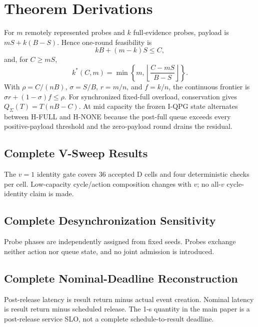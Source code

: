 \documentclass[10pt,onecolumn]{IEEEtran}
\begin{document}
\section{Theorem Derivations}
For $m$ remotely represented probes and $k$ full-evidence probes, payload is $mS+k(B-S)$. Hence one-round feasibility is
\[kB+(m-k)S\le C,\]
and, for $C\ge mS$,
\[k^*(C,m)=\min\left\{m,\left\lfloor\frac{C-mS}{B-S}\right\rfloor\right\}.\]
With $\rho=C/(nB)$, $\sigma=S/B$, $r=m/n$, and $f=k/n$, the continuous frontier is $\sigma r+(1-\sigma)f\le\rho$. For synchronized fixed-full overload, conservation gives $Q_\Sigma(T)=T(nB-C)$. At mid capacity the frozen I-QPG state alternates between H-FULL and H-NONE because the post-full queue exceeds every positive-payload threshold and the zero-payload round drains the residual.

\begin{landscape}
\section{Complete V-Sweep Results}
The $v=1$ identity gate covers 36 accepted D cells and four deterministic checks per cell. Low-capacity cycle/action composition changes with $v$; no all-$v$ cycle-identity claim is made.
\scriptsize\end{landscape}

\begin{landscape}
\section{Complete Desynchronization Sensitivity}
Probe phases are independently assigned from fixed seeds. Probes exchange neither action nor queue state, and no joint admission is introduced.
\scriptsize\end{landscape}

\begin{landscape}
\section{Complete Nominal-Deadline Reconstruction}
Post-release latency is result return minus actual event creation. Nominal latency is result return minus scheduled release. The 1-s quantity in the main paper is a post-release service SLO, not a complete schedule-to-result deadline.
\tiny\end{landscape}
\end{document}
